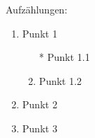 \documentclass{article}
\begin{document}
Aufzählungen:
\begin{enumerate}
\item Punkt 1
\begin{enumerate}
\item[*] Punkt 1.1
\item Punkt 1.2
\end{enumerate}
\item Punkt 2
\item Punkt 3
\end{enumerate}
\end{document}
